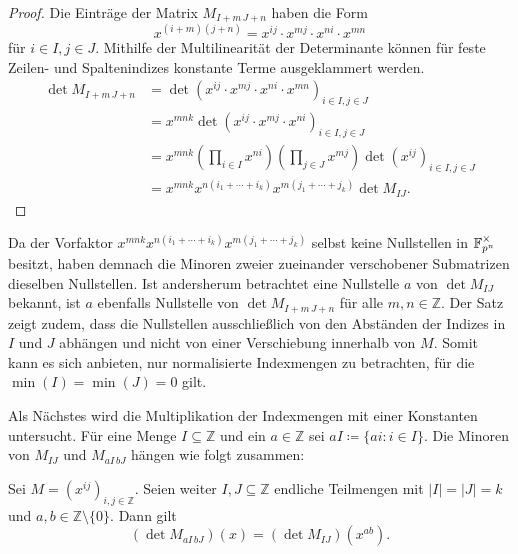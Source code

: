 \begin{proof}
    Die Einträge der Matrix $M_{I+m\,J+n}$ haben die Form 
    \begin{equation*}
        x^{(i+m)(j+n)} = x^{ij} \cdot x^{mj} \cdot x^{ni} \cdot x^{mn} 
    \end{equation*} für $i\in I, j\in J$. Mithilfe der Multilinearität der Determinante können für feste Zeilen- und Spaltenindizes konstante Terme ausgeklammert werden.
    \begin{align*}
        \det M_{I+m\,J+n}    &= \det \left(x^{ij} \cdot x^{mj} \cdot x^{ni} \cdot x^{mn} \right)_{i\in I,j\in J} \\ 
                            &= x^{mnk} \det \left(x^{ij} \cdot x^{mj} \cdot x^{ni} \right)_{i\in I,j\in J} \\ 
                            &= x^{mnk} \left( \prod_{i \in I} x^{ni} \right) \left( \prod_{j \in J} x^{mj}\right)  \det \left(x^{ij}\right)_{i\in I,j\in J} \\
                            &= x^{mnk} x^{n(i_1 +\cdots +i_k)} x^{m(j_1+\cdots +j_k)}\det M_{IJ}.
    \end{align*}
\end{proof}

Da der Vorfaktor $x^{mnk} x^{n(i_1 +\cdots +i_k)} x^{m(j_1+\cdots +j_k)}$ selbst keine Nullstellen in $\field{p}[n]^\times$ besitzt, haben demnach die Minoren zweier zueinander verschobener Submatrizen dieselben Nullstellen. Ist andersherum betrachtet eine Nullstelle $a$ von $\det M_{IJ}$ bekannt, ist $a$ ebenfalls Nullstelle von $\det M_{I+m\,J+n}$ für alle $m,n \in \mathbb{Z}$. Der Satz zeigt zudem, dass die Nullstellen ausschließlich von den Abständen der Indizes in $I$ und $J$ abhängen und nicht von einer Verschiebung innerhalb von $M$. Somit kann es sich anbieten, nur normalisierte Indexmengen zu betrachten, für die $\min(I) = \min(J) = 0$ gilt.

Als Nächstes wird die Multiplikation der Indexmengen mit einer Konstanten untersucht. Für eine Menge $I \subseteq \mathbb{Z}$ und ein $a \in \mathbb{Z}$ sei $aI \coloneqq \{ai:i\in I\}$. Die Minoren von $M_{IJ}$ und $M_{aI\,bJ}$ hängen wie folgt zusammen:

\begin{satz} \label{satz:skalierung}
    \sloppy Sei $M = \left( x^{ij} \right)_{i,j \in \mathbb{Z}}$. Seien weiter $I,J \subseteq \mathbb{Z}$ endliche Teilmengen mit ${|I|=|J|=k}$ und $a,b \in \mathbb{Z}\setminus\{0\}$. Dann gilt
    \begin{equation*}
        \left( \det{} M_{aI\,bJ} \right) (x) = \left( \det{} M_{IJ} \right) (x^{ab}).
    \end{equation*}
\end{satz}

